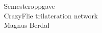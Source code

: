 \documentclass[a4paper]{article}
\begin{document}
\begin{titlepage}
\begin{center}
\Large Semesteroppgave\\
\vspace{10pt}
\Large CrazyFlie trilateration network\\
\vspace{10pt}
\large Magnus Berdal
\end{center}
\end{titlepage}
\clearpage
\tableofcontents











\end{document}
